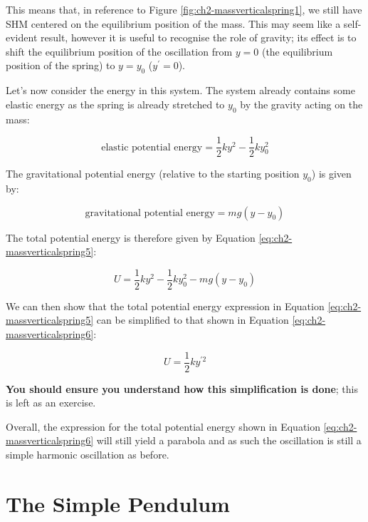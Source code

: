 \documentclass[
]{book}
\begin{document}
This means that, in reference to Figure \ref{fig:ch2-massverticalspring1}, we still have SHM centered on the equilibrium position of the mass. This may seem like a self-evident result, however it is useful to recognise the role of gravity; its effect is to shift the equilibrium position of the oscillation from \(y = 0\) (the equilibrium position of the spring) to \(y = y_0\) (\(y^\prime = 0\)).

Let's now consider the energy in this system. The system already contains some elastic energy as the spring is already stretched to \(y_0\) by the gravity acting on the mass:

\begin{equation}
\textrm{elastic potential energy} = \frac{1}{2}ky^2 - \frac{1}{2}ky_0^2
\end{equation}

The gravitational potential energy (relative to the starting position \(y_0\)) is given by:

\begin{equation}
\textrm{gravitational potential energy} = mg(y-y_0)
\end{equation}

The total potential energy is therefore given by Equation \eqref{eq:ch2-massverticalspring5}:

\begin{equation}
U = \frac{1}{2}ky^2 - \frac{1}{2}ky_0^2 - mg(y-y_0)
\label{eq:ch2-massverticalspring5}
\end{equation}

We can then show that the total potential energy expression in Equation \eqref{eq:ch2-massverticalspring5} can be simplified to that shown in Equation \eqref{eq:ch2-massverticalspring6}:

\begin{equation}
U = \frac{1}{2} ky^{\prime 2}
\label{eq:ch2-massverticalspring6}
\end{equation}

\textbf{You should ensure you understand how this simplification is done}; this is left as an exercise.

Overall, the expression for the total potential energy shown in Equation \eqref{eq:ch2-massverticalspring6} will still yield a parabola and as such the oscillation is still a simple harmonic oscillation as before.

\hypertarget{sec-ch2-simplependulum}{%
\section{The Simple Pendulum}\label{sec-ch2-simplependulum}}
\end{document}
